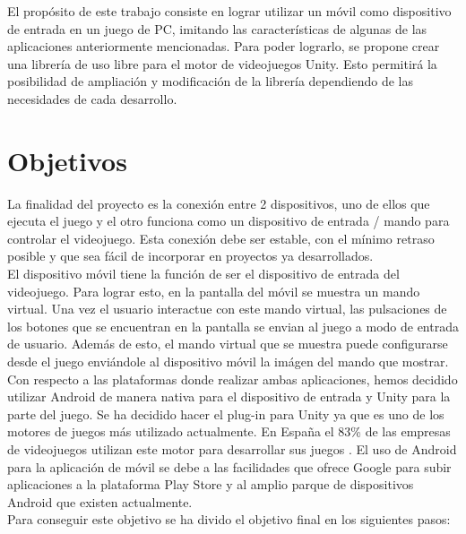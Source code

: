 El prop\'osito de este trabajo consiste en lograr utilizar un m\'ovil como dispositivo de entrada en un juego de PC, imitando las caracter\'isticas de algunas de las aplicaciones anteriormente mencionadas. Para poder lograrlo, se propone crear una librer\'ia de uso libre para el motor de videojuegos Unity. Esto permitir\'a la posibilidad de ampliaci\'on y modificaci\'on de la librer\'ia dependiendo de las necesidades de cada desarrollo.


\section{Objetivos}

La finalidad del proyecto es la conexi\'on entre 2 dispositivos, uno de ellos que ejecuta el juego y el otro funciona como un dispositivo de entrada / mando para controlar el videojuego. Esta conexi\'on debe ser estable, con el m\'inimo retraso posible y que sea f\'acil de incorporar en proyectos ya desarrollados.\\

El dispositivo m\'ovil tiene la funci\'on de ser el dispositivo de entrada del videojuego. Para lograr esto, en la pantalla del m\'ovil se muestra un mando virtual. Una vez el usuario interactue con este mando virtual, las pulsaciones de los botones que se encuentran en la pantalla se envian al juego a modo de entrada de usuario. Adem\'as de esto, el mando virtual que se muestra puede configurarse desde el juego envi\'andole al dispositivo m\'ovil la im\'agen del mando que mostrar.\\

Con respecto a las plataformas donde realizar ambas aplicaciones, hemos decidido utilizar Android de manera nativa para el dispositivo de entrada y Unity para la parte del juego. Se ha decidido hacer el plug-in para Unity ya que es uno de los motores de juegos m\'as utilizado actualmente. En Espa\~na el 83\% de las empresas de videojuegos utilizan este motor para desarrollar sus juegos . El uso de Android para la aplicaci\'on de m\'ovil se debe a las facilidades que ofrece Google para subir aplicaciones a la plataforma Play Store y al amplio parque de dispositivos Android que existen actualmente.\\

Para conseguir este objetivo se ha divido el objetivo final en los siguientes pasos:

